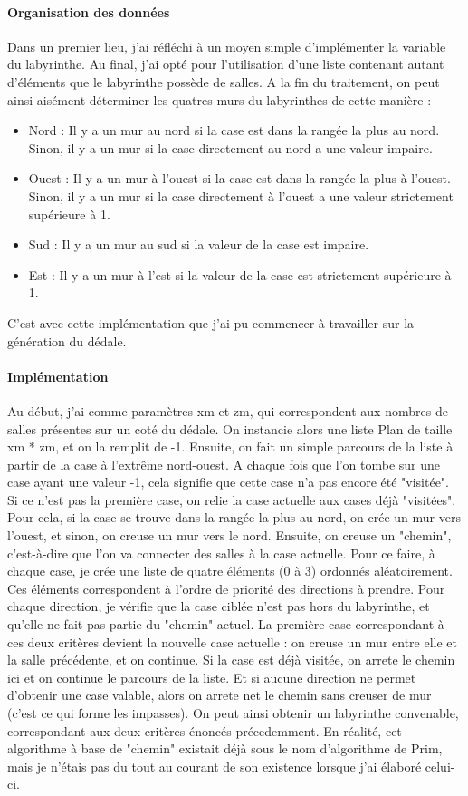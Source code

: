 \documentclass{article}
\begin{document}
\paragraph{Organisation des données}
Dans un premier lieu, j'ai réfléchi à un moyen simple d'implémenter la variable du labyrinthe. Au final, j'ai opté pour l'utilisation d'une liste contenant autant d'éléments que le labyrinthe possède de salles. A la fin du traitement, on peut ainsi aisément déterminer les quatres murs du labyrinthes de cette manière :
\begin{itemize}
\item Nord : Il y a un mur au nord si la case est dans la rangée la plus au nord. Sinon, il y a un mur si la case directement au nord a une valeur impaire.
\item Ouest : Il y a un mur à l'ouest si la case est dans la rangée la plus à l'ouest. Sinon, il y a un mur si la case directement à l'ouest a une valeur strictement supérieure à 1.
\item Sud : Il y a un mur au sud si la valeur de la case est impaire.
\item Est : Il y a un mur à l'est si la valeur de la case est strictement supérieure à 1.
\end{itemize}
C'est avec cette implémentation que j'ai pu commencer à travailler sur la génération du dédale.

\paragraph{Implémentation}
Au début, j'ai comme paramètres xm et zm, qui correspondent aux nombres de salles présentes sur un coté du dédale. On instancie alors une liste Plan de taille xm * zm, et on la remplit de -1.
Ensuite, on fait un simple parcours de la liste à partir de la case à l'extrême nord-ouest. A chaque fois que l'on tombe sur une case ayant une valeur -1, cela signifie que cette case n'a pas encore été "visitée". Si ce n'est pas la première case, on relie la case actuelle aux cases déjà "visitées". Pour cela, si la case se trouve dans la rangée la plus au nord, on crée un mur vers l'ouest, et sinon, on creuse un mur vers le nord. Ensuite, on creuse un "chemin", c'est-à-dire que l'on va connecter des salles à la case actuelle. Pour ce faire, à chaque case, je crée une liste de quatre éléments (0 à 3) ordonnés aléatoirement. Ces éléments correspondent à l'ordre de priorité des directions à prendre. Pour chaque direction, je vérifie que la case ciblée n'est pas hors du labyrinthe, et qu'elle ne fait pas partie du "chemin" actuel. La première case correspondant à ces deux critères devient la nouvelle case actuelle : on creuse un mur entre elle et la salle précédente, et on continue. Si la case est déjà visitée, on arrete le chemin ici et on continue le parcours de la liste. Et si aucune direction ne permet d'obtenir une case valable, alors on arrete net le chemin sans creuser de mur (c'est ce qui forme les impasses). On peut ainsi obtenir un labyrinthe convenable, correspondant aux deux critères énoncés précedemment.
En réalité, cet algorithme à base de "chemin" existait déjà sous le nom d'algorithme de Prim, mais je n'étais pas du tout au courant de son existence lorsque j'ai élaboré celui-ci.
\end{document}
